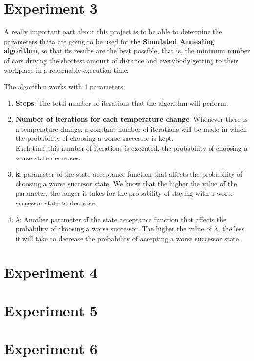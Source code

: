 \documentclass[12]{article}
\begin{document}
\section{Experiment 3}

A really important part about this project is to be able to determine the parameters thata are going to be used for the \textbf{Simulated Annealing algorithm}, so that its results are the best possible, that is, the minimum number of cars driving the shortest amount of distance and everybody getting to their workplace in a reasonable execution time. 
\\
\medskip

The algorithm works with 4 parameters:
\begin{enumerate}
\item \textbf{Steps}: The total number of iterations that the algorithm will perform. 
\item \textbf{Number of iterations for each temperature change}: Whenever there is a temperature change, a constant number of iterations will be made in which the probability of choosing a worse successor is kept. 
\\
Each time this number of iterations is executed, the probability of choosing a worse state decreases. 
\item \textbf{k}: parameter of the state acceptance function that affects the probability of choosing a worse succesor state. We know that the higher the value of the parameter, the longer it takes for the probability of staying with a worse successor state to decrease. 

\item \textbf{$\lambda$}: Another parameter of the state acceptance function that affects the probability of choosing a worse successor. The higher the value of $\lambda$, the less it will take to decrease the probability of accepting a worse successor state. 


\end{enumerate}

\section{Experiment 4}



\section{Experiment 5}


\section{Experiment 6}
\end{document}
